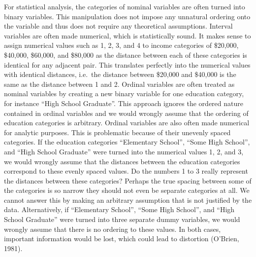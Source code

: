 \documentclass[12pt,econ]{sources/authesis}
\begin{document}
For statistical analysis, the categories of nominal variables are often turned into binary variables. This manipulation does not impose any unnatural ordering onto the variable and thus does not require any theoretical assumptions. Interval variables are often made numerical, which is statistically sound. It makes sense to assign numerical values such as 1, 2, 3, and 4 to income categories of \$20,000, \$40,000, \$60,000, and \$80,000 as the distance between each of these categories is identical for any adjacent pair. This translates perfectly into the numerical values with identical distances, i.e.~the distance between \$20,000 and \$40,000 is the same as the distance between 1 and 2. Ordinal variables are often treated as nominal variables by creating a new binary variable for one education category, for instance ``High School Graduate''. This approach ignores the ordered nature contained in ordinal variables and we would wrongly assume that the ordering of education categories is arbitrary. Ordinal variables are also often made numerical for analytic purposes. This is problematic because of their unevenly spaced categories. If the education categories ``Elementary School'', ``Some High School'', and ``High School Graduate'' were turned into the numerical values 1, 2, and 3, we would wrongly assume that the distances between the education categories correspond to these evenly spaced values. Do the numbers 1 to 3 really represent the distances between these categories? Perhaps the true spacing between some of the categories is so narrow they should not even be separate categories at all. We cannot answer this by making an arbitrary assumption that is not justified by the data. Alternatively, if ``Elementary School'', ``Some High School'', and ``High School Graduate'' were turned into three separate dummy variables, we would wrongly assume that there is no ordering to these values. In both cases, important information would be lost, which could lead to distortion (O'Brien, 1981).
\end{document}
